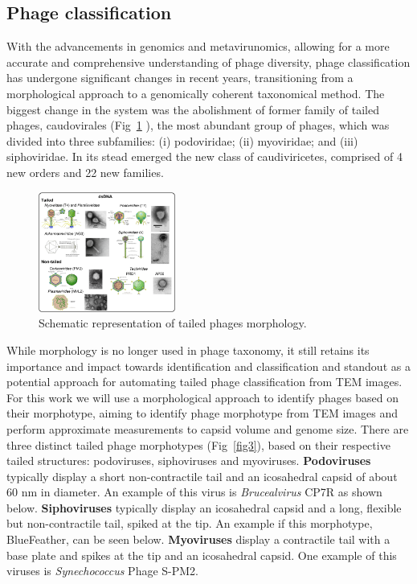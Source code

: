 \documentclass[runningheads]{llncs}
\begin{document}
\subsection{Phage classification}
With the advancements in genomics and metavirunomics, allowing for a more accurate and comprehensive understanding of phage diversity, phage classification has undergone significant changes in recent years, transitioning from a morphological approach to a genomically coherent taxonomical method. The biggest change in the system was the abolishment of former family of tailed phages, caudovirales (Fig~\ref{fig2} \cite{dion2020}), the most abundant group of phages, which was divided into three subfamilies: (i) podoviridae; (ii) myoviridae; and (iii) siphoviridae. In its stead emerged the new class of caudiviricetes, comprised of 4 new orders and 22 new families. \cite{dion2020,turner2021,turner2023,ackermann2007}   
%
%
\begin{figure}
\begin{center}
\includegraphics[width=0.4\textwidth]{./figures/fig2-tailed-morpho.png}
\caption{Schematic representation of tailed phages morphology. \cite{dion2020}} \label{fig2}
\end{center}
\end{figure}

%
%
While morphology is no longer used in phage taxonomy, it still retains its importance and impact towards identification and classification and standout as a potential approach for automating tailed phage classification from TEM images. For this work we will use a morphological approach to identify phages based on their morphotype, aiming to identify phage morphotype from TEM images and perform approximate measurements to capsid volume and genome size. There are three distinct tailed phage morphotypes (Fig~\ref{fig3}), based on their respective tailed structures: podoviruses, siphoviruses and myoviruses. \cite{maffei2021} \textbf{Podoviruses} typically display a short non-contractile tail and an icosahedral capsid of about 60 nm in diameter. An example of this virus is \textit{Brucealvirus} CP7R as shown below. \cite{volozhantsev2012} \textbf{Siphoviruses} typically display an icosahedral capsid and a long, flexible but non-contractile tail, spiked at the tip. An example if this morphotype, BlueFeather, can be seen below. \cite{demo2021} \textbf{Myoviruses} display a contractile tail with a base plate and spikes at the tip and an icosahedral capsid. One example of this viruses is \textit{Synechococcus} Phage S-PM2. \cite{mann2005}
\end{document}
